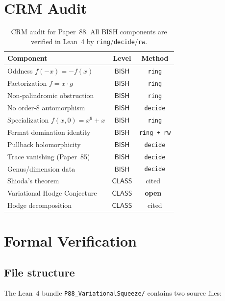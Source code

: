 \documentclass[11pt]{article}
\theoremstyle{plain}
\theoremstyle{definition}
\theoremstyle{remark}
\newcommand{\BISH}{\ensuremath{\mathsf{BISH}}}
\newcommand{\CLASS}{\ensuremath{\mathsf{CLASS}}}
\begin{document}
\section{CRM Audit}
\label{sec:audit}

\begin{table}[h]
\centering
\small
\begin{tabular}{>{\raggedright}p{5.5cm} c c}
\toprule
\textbf{Component} & \textbf{Level} & \textbf{Method} \\
\midrule
Oddness $f(-x) = -f(x)$ & \BISH & \texttt{ring} \\
Factorization $f = x \cdot g$ & \BISH & \texttt{ring} \\
Non-palindromic obstruction & \BISH & \texttt{ring} \\
No order-8 automorphism & \BISH & \texttt{decide} \\
Specialization $f(x,0) = x^9+x$ & \BISH & \texttt{ring} \\
Fermat domination identity & \BISH & \texttt{ring + rw} \\
Pullback holomorphicity & \BISH & \texttt{decide} \\
Trace vanishing (Paper~85) & \BISH & \texttt{decide} \\
Genus/dimension data & \BISH & \texttt{decide} \\
\midrule
Shioda's theorem & \CLASS & cited~\cite{Shioda82} \\
Variational Hodge Conjecture & \CLASS & \textbf{open}~\cite{Grothendieck66} \\
Hodge decomposition & \CLASS & cited \\
\bottomrule
\end{tabular}
\caption{CRM audit for Paper~88.  All BISH components are verified
in Lean~4 by \texttt{ring}/\texttt{decide}/\texttt{rw}.}
\label{tab:audit}
\end{table}

\section{Formal Verification}
\label{sec:lean}

\subsection{File structure}

The Lean~4 bundle \texttt{P88\_VariationalSqueeze/} contains two
source files:
\end{document}

